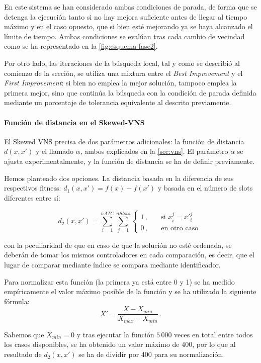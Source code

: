 En este sistema se han considerado ambas condiciones de parada, de forma que se detenga la ejecución tanto si no hay mejora suficiente antes de llegar al tiempo máximo y en el caso opuesto, que si bien esté mejorando ya se haya alcanzado el límite de tiempo. Ambas condiciones se evalúan tras cada cambio de vecindad como se ha representado en la \autoref{fig:esquema-fase2}.

Por otro lado, las iteraciones de la búsqueda local, tal y como se describió al comienzo de la sección, se utiliza una mixtura entre el \textit{Best Improvement} y el \textit{First Improvement}: si bien no emplea la mejor solución, tampoco emplea la primera mejor, sino que continúa la búsqueda con la condición de parada definida mediante un porcentaje de tolerancia equivalente al descrito previamente.

\paragraph{Función de distancia en el Skewed-VNS}
El Skewed VNS precisa de dos parámetros adicionales: la función de distancia $d(x,x')$ y el llamado $\alpha$, ambos explicados en la \autoref{sec:vns}. El parámetro $\alpha$ se ajusta experimentalmente, y la función de distancia se ha de definir previamente.

\begin{minipage}{\textwidth}
Hemos planteado dos opciones. La distancia basada en la diferencia de sus respectivos fitness: $d_1(x,x')=f(x)-f(x')$ y basada en el número de slots diferentes entre sí:

\[
d_2(x,x')=\sum_{i=1}^{nATC} \sum_{j=1}^{nSlots}
\begin{cases}
    1\,, & \quad \textrm{si } x_i^j = {x'}_i^j \\
    0\,, & \quad \textrm{en otro caso }
\end{cases}
\]

\end{minipage}

con la peculiaridad de que en caso de que la solución no esté ordenada, se deberán de tomar los mismos controladores en cada comparación, es decir, que el lugar de comparar mediante índice se compara mediante identificador.

Para normalizar esta función (la primera ya está entre 0 y 1) se ha medido empíricamente el valor máximo posible de la función
y se ha utilizado la siguiente fórmula:
\[
    X' = \frac{X-X_{min}}{X_{max}-X_{min}} \,.
\]

Sabemos que $X_{min}=0$ y tras ejecutar la función $5\,000$ veces en total entre todos los casos disponibles, se ha obtenido un valor máximo de 400, por lo que al resultado de $d_2(x,x')$ se ha de dividir por 400 para su normalización.